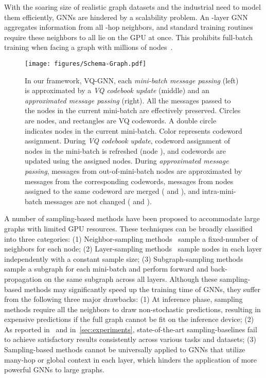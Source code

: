 \documentclass{article}
\renewcommand{\emph}[1]{\textit{#1}}
\begin{document}
With the soaring size of realistic graph datasets and the industrial need to model them efficiently, GNNs are hindered by a scalability problem. An -layer GNN aggregates information from all -hop neighbors, and standard training routines require these neighbors to all lie on the GPU at once.  This prohibits full-batch training when facing a graph with millions of nodes~\citep{hu2020open}.



\begin{figure}[t]
    \centering
    \texttt{[image: figures/Schema-Graph.pdf]}
    \caption{In our framework, VQ-GNN, each \emph{mini-batch message passing} (left) is approximated by a \emph{VQ codebook update} (middle) and an \emph{approximated message passing} (right). All the messages passed to the nodes in the current mini-batch are effectively preserved. Circles are nodes, and rectangles are VQ codewords. A double circle indicates nodes in the current mini-batch. Color represents codeword assignment. During \emph{VQ codebook update}, codeword assignment of nodes in the mini-batch is refreshed (node ), and codewords are updated using the assigned nodes. During \emph{approximated message passing}, messages from out-of-mini-batch nodes are approximated by messages from the corresponding codewords, messages from nodes assigned to the same codeword are merged ( and ), and intra-mini-batch messages are not changed ( and ).}
    \label{fig:schema-graph}
    \vspace{-5pt}
\end{figure}



A number of sampling-based methods have been proposed to accommodate large graphs with limited GPU resources. These techniques can be broadly classified into three categories: (1) Neighbor-sampling methods~\citep{hamilton2017inductive,chen2018stochastic} sample a fixed-number of neighbors for each node; (2) Layer-sampling methods~\citep{chen2018fastgcn,zou2019layer} sample nodes in each layer independently with a constant sample size; (3) Subgraph-sampling methods~\citep{chiang2019cluster,zeng2019graphsaint} sample a subgraph for each mini-batch and perform forward and back-propagation on the same subgraph across all layers. Although these sampling-based methods may significantly speed up the training time of GNNs, they suffer from the following three major drawbacks: (1) At inference phase, sampling methods require all the neighbors to draw non-stochastic predictions, resulting in expensive predictions if the full graph cannot be fit on the inference device; (2) As reported in~\citep{hu2020open} and in~\cref{sec:experiments}, state-of-the-art sampling-baselines fail to achieve satisfactory results consistently across various tasks and datasets; (3) Sampling-based methods cannot be universally applied to GNNs that utilize many-hop or global context in each layer, which hinders the application of more powerful GNNs to large graphs.
\end{document}
